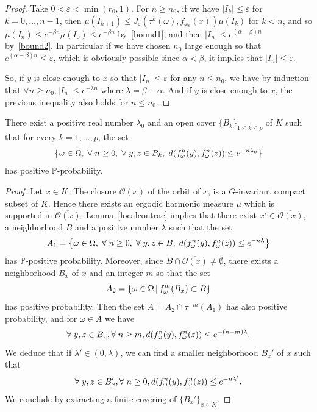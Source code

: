 \documentclass[AHL,Unicode,longabstracts,published]{cedram}
\newcommand{\bbP}{\mathbb{P}}
\newcommand{\clO}{\mathcal{O}}
\newcommand{\ep}{\varepsilon}
\let\originalleft\left
\let\originalright\right
\renewcommand{\left}{\mathopen{}\mathclose\bgroup\originalleft}
\renewcommand{\right}{\aftergroup\egroup\originalright}
\let\oldforall\forall
\renewcommand*{\forall}{\mathrel{\oldforall}}
\begin{document}
\begin{proof}
Take $0 <\ep < \min(r_0,1)$. For $n\geq n_0$, if we have $|I_k|\leq \ep$ for $k=0,\dots, n-1$, then $\mu(I_{k+1})\leq J_\ep(\tau^k(\omega),f_{\omega_k}(x))\mu(I_k)$ for $k<n$, and so $\mu(I_n)\leq e^{-\beta n}\mu(I_0)\leq e^{-\beta n}$ by~\eqref{bound1}, and then $|I_n|\leq e^{(\alpha-\beta)n}$ by~\eqref{bound2}. In particular if we have chosen $n_0$ large enough so that $e^{(\alpha-\beta)n}\leq \ep$, which is obviously possible since $\alpha<\beta$, it implies that $|I_n|\leq \ep$.

So, if $y$ is close enough to $x$ so that $|I_{n}|\leq \ep$ for any $n \leq n_0$, we have by induction that $\forall n\geq n_0, |I_n|\leq e^{-\lambda n}$ where $\lambda=\beta-\alpha$. And if $y$ is close enough to $x$, the previous inequality also holds for $n\leq n_0$.
\end{proof}

\begin{lemm}\label{uniform}
There exist a positive real number $\lambda_0$ and an open cover $\{B_k\}_{1\leq k\leq p}$ of $K$ such that for every $k=1,\dots,p$, the set
\[
\left\{\omega\in \Omega,\;\forall n\geq 0,\;\forall y,z \in B_k,\; d\left(f_\omega^n(y),f_\omega^n(z)\right)\leq e^{-n\lambda_0}\right\}
\]
has positive $\bbP$-probability.
\end{lemm}
\begin{proof}
Let $x\in K$. The closure $\overline{\clO(x)}$ of the orbit of $x$, is a $G$-invariant compact subset of $K$. Hence there exists an ergodic harmonic measure $\mu$ which is supported in $\overline{\clO(x)}$. Lemma~\ref{localcontrae} implies that there exist $x'\in \overline{\clO(x)}$, a neighborhood $B$ and a positive number $\lambda$ such that the set
\[
A_1=\left\{\omega\in \Omega,\;\forall n\geq 0,\; \forall y,z \in B,\; d\left(f_\omega^n(y),f_\omega^n(z)\right)\leq e^{-n\lambda}\right\}
\]
has $\bbP$-positive probability. Moreover, since $B\cap \overline{\clO(x)}\not=\emptyset$, there exists a neighborhood $B_x$ of $x$ and an integer $m$ so that the set
\[
A_2=\left\{\omega\in\Omega\,\middle|\,f_\omega^m(B_x)\subset B\right\}
\]
has positive probability. Then the set $A=A_2 \cap \tau^{-m}(A_1)$ has also positive probability, and for $\omega\in A$ we have
\[
\forall y,z \in B_x, \forall n\geq m, d\left(f_\omega^n(y),f_\omega^n(z)\right)\leq e^{-(n-m)\lambda}.
\]
We deduce that if $\lambda'\in (0,\lambda)$, we can find a smaller neighborhood $B_x'$ of $x$ such that
\[
\forall y,z \in B_x', \forall n\geq 0, d\left(f_\omega^n(y),f_\omega^n(z)\right)\leq e^{-n\lambda'}.
\]
We conclude by extracting a finite covering of $\{B_x'\}_{x\in K}$.
\end{proof}
\end{document}
